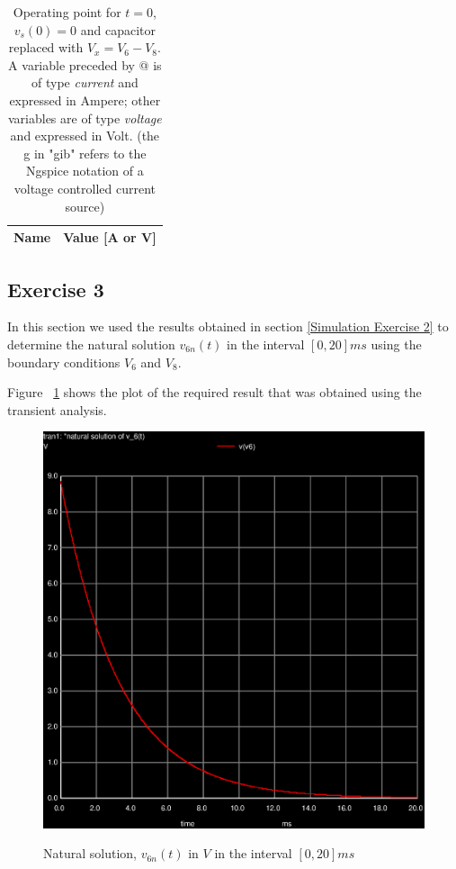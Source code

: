 \begin{table}[!ht]
  \centering
  \caption{Operating point for $t = 0$, $v_s(0) = 0$ and capacitor replaced with $V_x = V_6 - V_8$. A variable preceded by @ is of type {\em current}
    and expressed in Ampere; other variables are of type {\it voltage} and expressed in
    Volt. (the g in "gib" refers to the Ngspice notation of a voltage controlled current source)}
  \begin{tabular}{|l|r|}
    \hline    
    {\bf Name} & {\bf Value [A or V]} \\ \hline
    
  \end{tabular}
  \label{tab:op2}
\end{table}
\newpage
\subsection{Exercise 3}
\label{Simulation Exercise 3}
In this section we used the results obtained in section \ref{Simulation Exercise 2} to determine the natural solution $v_{6n}(t)$ in the interval $[0,20]ms$ using the boundary conditions $V_6$ and $V_8$.

Figure ~\ref{fig:simulation_3} shows the plot of the required result that was obtained using the transient analysis.

\begin{figure}[!ht] \centering
\caption{Natural solution, $v_{6n}(t)$ in $V$ in the interval $[0,20]ms$}
\includegraphics[width=0.6\linewidth]{trans3.eps}
\label{fig:simulation_3}
\end{figure}
\newpage
